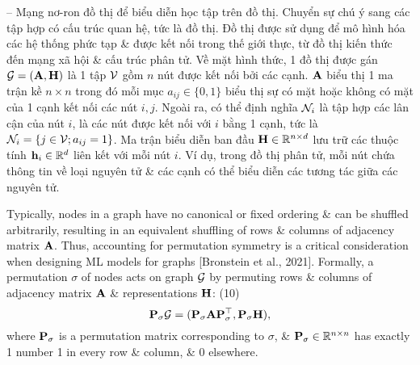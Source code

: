 \documentclass{article}
\begin{document}
\begin{itemize}
    -- {\sf Mạng nơ-ron đồ thị để biểu diễn học tập trên đồ thị.} Chuyển sự chú ý sang các tập hợp có cấu trúc quan hệ, tức là đồ thị. Đồ thị được sử dụng để mô hình hóa các hệ thống phức tạp \& được kết nối trong thế giới thực, từ đồ thị kiến thức đến mạng xã hội \& cấu trúc phân tử. Về mặt hình thức, 1 đồ thị được gán ${\cal G} = ({\bf A},{\bf H})$ là 1 tập ${\cal V}$ gồm $n$ nút được kết nối bởi các cạnh. ${\bf A}$ biểu thị 1 ma trận kề $n\times n$ trong đó mỗi mục $a_{ij}\in\{0,1\}$ biểu thị sự có mặt hoặc không có mặt của 1 cạnh kết nối các nút $i,j$. Ngoài ra, có thể định nghĩa ${\cal N}_i$ là tập hợp các lân cận của nút $i$, là các nút được kết nối với $i$ bằng 1 cạnh, tức là ${\cal N}_i = \{j\in{\cal V};a_{ij} = 1\}$. Ma trận biểu diễn ban đầu ${\bf H}\in\mathbb{R}^{n\times d}$ lưu trữ các thuộc tính ${\bf h}_i\in\mathbb{R}^d$ liên kết với mỗi nút $i$. Ví dụ, trong đồ thị phân tử, mỗi nút chứa thông tin về loại nguyên tử \& các cạnh có thể biểu diễn các tương tác giữa các nguyên tử.

    Typically, nodes in a graph have no canonical or fixed ordering \& can be shuffled arbitrarily, resulting in an equivalent shuffling of rows \& columns of adjacency matrix ${\bf A}$. Thus, accounting for permutation symmetry is a critical consideration when designing ML models for graphs [Bronstein et al., 2021]. Formally, a permutation $\sigma$ of nodes acts on graph ${\cal G}$ by permuting rows \& columns of adjacency matrix ${\bf A}$ \& representations ${\bf H}$: (10)
    \begin{equation*}
        {\bf P}_\sigma{\cal G} = ({\bf P}_\sigma{\bf A}{\bf P}_\sigma^\top,{\bf P}_\sigma{\bf H}),
    \end{equation*}
    where ${\bf P}_\sigma$ is a permutation matrix corresponding to $\sigma$, \& ${\bf P}_\sigma\in\mathbb{R}^{n\times n}$ has exactly 1 number 1 in every row \& column, \& 0 elsewhere.


\end{itemize}
\end{document}
